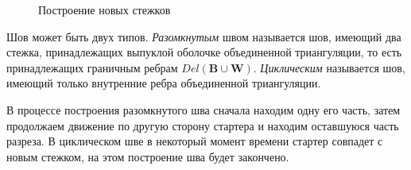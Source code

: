 \documentclass[12pt]{article}
\begin{document}
\begin{figure}[htb!]
	\begin{minipage}[h]{0.49\linewidth}
	\end{minipage}
	\hfill
	\begin{minipage}[h]{0.49\linewidth}
	\end{minipage}
	\caption{Построение новых стежков}
	\label{pic:dir}
\end{figure}

Шов может быть двух типов.
{\it Разомкнутым} швом называется шов, имеющий два стежка, принадлежащих выпуклой оболочке объединенной триангуляции,
то есть принадлежащих граничным ребрам $Del(\textbf{B} \cup \textbf{W})$.
{\it Циклическим} называется шов, имеющий только внутренние ребра объединенной триангуляции.

В процессе построения разомкнутого шва сначала находим одну его часть,
затем продолжаем движение по другую сторону стартера и находим оставшуюся часть разреза.
В циклическом шве в некоторый момент времени стартер совпадет с новым стежком,
на этом построение шва будет закончено.
\end{document}
